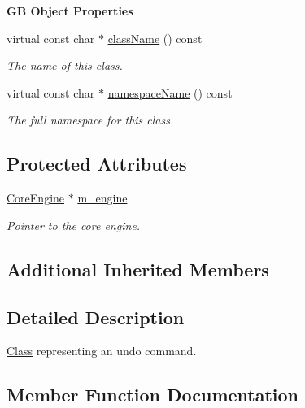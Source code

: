 \begin{Indent}\textbf{ GB Object Properties}\par
\begin{DoxyCompactItemize}
\item 
virtual const char $\ast$ \mbox{\hyperlink{classrev_1_1_undo_command_ab30f020732532e7cfd5472bdee65dcdb}{class\+Name}} () const
\begin{DoxyCompactList}\small\item\em The name of this class. \end{DoxyCompactList}\item 
virtual const char $\ast$ \mbox{\hyperlink{classrev_1_1_undo_command_aea7ceb3f5ea266e697f01a65da7afec5}{namespace\+Name}} () const
\begin{DoxyCompactList}\small\item\em The full namespace for this class. \end{DoxyCompactList}\end{DoxyCompactItemize}
\end{Indent}
\subsection*{Protected Attributes}
\begin{DoxyCompactItemize}
\item 
\mbox{\label{classrev_1_1_undo_command_a036421ccb2a397ff4069b844926cc727}} 
\mbox{\hyperlink{classrev_1_1_core_engine}{Core\+Engine}} $\ast$ \mbox{\hyperlink{classrev_1_1_undo_command_a036421ccb2a397ff4069b844926cc727}{m\+\_\+engine}}
\begin{DoxyCompactList}\small\item\em Pointer to the core engine. \end{DoxyCompactList}\end{DoxyCompactItemize}
\subsection*{Additional Inherited Members}


\subsection{Detailed Description}
\mbox{\hyperlink{struct_class}{Class}} representing an undo command. 

\subsection{Member Function Documentation}
\mbox{\label{classrev_1_1_undo_command_ab30f020732532e7cfd5472bdee65dcdb}} 
